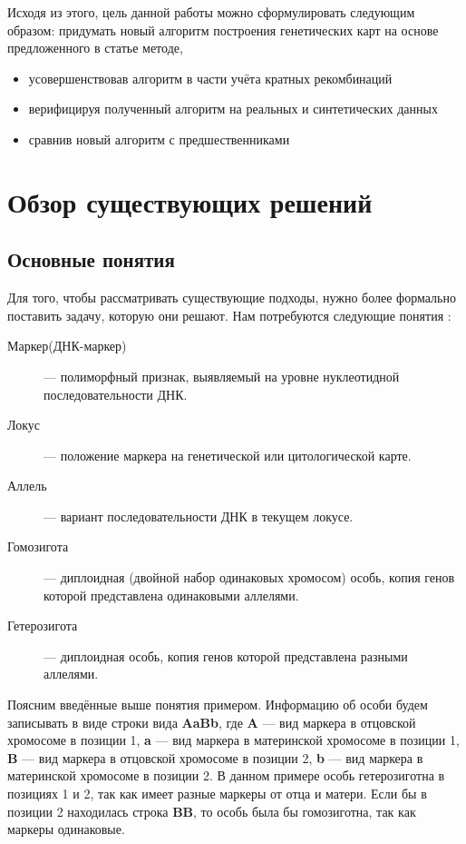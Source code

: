 \documentclass{matmex-diploma-custom}
\begin{document}
Исходя из этого, цель данной работы можно сформулировать следующим
образом: придумать новый алгоритм построения генетических карт на
основе предложенного в статье \cite{sysoev} методе,
\begin{itemize}
\item усовершенствовав алгоритм в части учёта кратных рекомбинаций
\item верифицируя полученный алгоритм на реальных и синтетических
  данных
\item сравнив новый алгоритм с предшественниками
\end{itemize}

\section{Обзор существующих решений}

\subsection*{Основные понятия}

Для того, чтобы рассматривать существующие подходы, нужно более
формально поставить задачу, которую они решают. Нам
потребуются следующие понятия \cite{dictionary}:
\begin{description}
\item[Маркер(ДНК-маркер)] --- полиморфный признак,
  выявляемый на уровне нуклеотидной последовательности ДНК.
\item[Локус] --- положение маркера на генетической или
  цитологической карте.
\item[Аллель] --- вариант последовательности ДНК в текущем локусе.
\item[Гомозигота] --- диплоидная (двойной набор одинаковых
  хромосом) особь, копия генов которой представлена одинаковыми
  аллелями.
\item[Гетерозигота] --- диплоидная особь, копия генов которой
  представлена разными аллелями.
\end{description}
Поясним введённые выше понятия примером. Информацию об особи будем
записывать в виде строки вида \textbf{AaBb}, где \textbf{A} --- вид
маркера в отцовской хромосоме в позиции 1, \textbf{a} --- вид маркера
в материнской хромосоме в позиции 1, \textbf{B} --- вид маркера в
отцовской хромосоме в позиции 2, \textbf{b} --- вид маркера в
материнской хромосоме в позиции 2. В данном примере особь
гетерозиготна в позициях 1 и 2, так как имеет разные маркеры от отца и
матери. Если бы в позиции 2 находилась строка \textbf{BB}, то особь
была бы гомозиготна, так как маркеры одинаковые.
\end{document}
